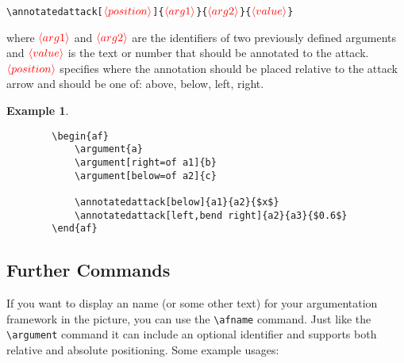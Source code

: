 \documentclass[headings=normal]{scrartcl}
\newcommand{\opt}[2][red]{\ensuremath{\textcolor{#1}{\langle #2\rangle}}}
\newtheorem{example}{Example}
\begin{document}
    \noindent
    \verb|\annotatedattack[|\opt{position}\verb|]{|\opt{arg1}\verb|}{|\opt{arg2}\verb|}{|\opt{value}\verb|}|
    
    \begin{list}{}{\leftmargin=\parindent\rightmargin=0pt}
        \item where \opt{arg1} and \opt{arg2} are the identifiers of two previously defined arguments and \opt{value} is the text or number that should be annotated to the attack.
        \opt{position} specifies where the annotation should be placed relative to the attack arrow and should be one of: \textsf{above}, \textsf{below}, \textsf{left}, \textsf{right}.
    \end{list}

    \begin{example}~

    \begin{minipage}{0.18\textwidth}
        \begin{center}
        \begin{af}
    
        \end{af}
        \end{center}
    \end{minipage}%
    \begin{minipage}{0.5\textwidth}
        \begin{verbatim}
        \begin{af}
            \argument{a}
            \argument[right=of a1]{b}
            \argument[below=of a2]{c}
    
            \annotatedattack[below]{a1}{a2}{$x$}
            \annotatedattack[left,bend right]{a2}{a3}{$0.6$}
        \end{af}
        \end{verbatim}
    \end{minipage}%
    \end{example}


\subsection{Further Commands}
    If you want to display an name (or some other text) for your argumentation framework in the picture, you can use the \verb|\afname| command.
    Just like the \verb|\argument| command it can include an optional identifier and supports both relative and absolute positioning.
    Some example usages:\\
\end{document}
